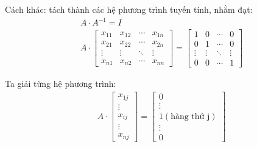 \documentclass[12pt]{article}
\begin{document}
Cách khác: tách thành các hệ phương trình tuyến tính, nhằm đạt:
\begin{align}
 &A \cdot A^{-1} = I \\
 &A \cdot \left[\begin{array}{cccc}
            x_{11} & x_{12} & \cdots & x_{1n}\\
            x_{21} & x_{22} & \cdots & x_{2n}\\
            \vdots & \vdots & \ddots & \vdots\\
            x_{n1} & x_{n2} & \cdots & x_{nn}
           \end{array}\right] = \left[\begin{array}{cccc}
            1 & 0 & \cdots & 0\\
            0 & 1 & \cdots & 0\\
            \vdots & \vdots & \ddots & \vdots\\
            0 & 0 & \cdots & 1
           \end{array}\right]
\end{align}

Ta giải từng hệ phương trình:
\begin{align}
 &A \cdot \left[\begin{array}{c}
            x_{1j}\\
            \vdots\\
            x_{ij}\\
            \vdots\\
            x_{nj}
           \end{array}\right] = \left[\begin{array}{cccc}
            0\\
            \vdots\\
            1 (\textrm{hàng thứ j})\\
            \vdots\\
            0
           \end{array}\right]
\end{align}


\label{lastpage}
\end{document}
